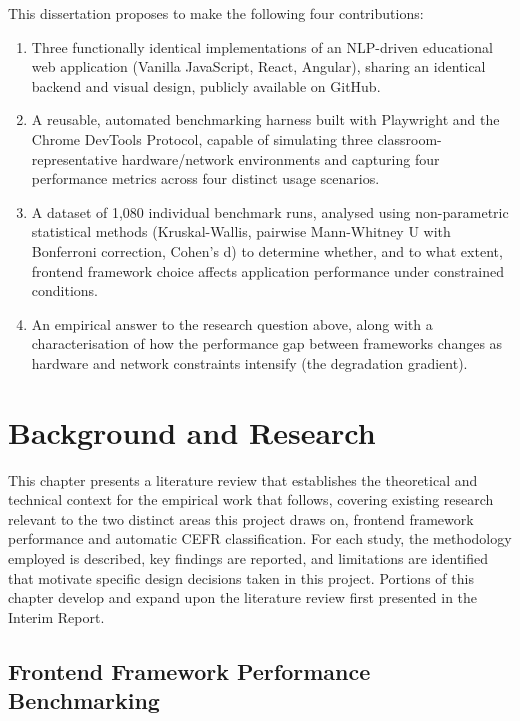 \documentclass[11pt,a4paper]{report}
\begin{document}
This dissertation proposes to make the following four contributions:

\begin{enumerate}
  \item Three functionally identical implementations of an NLP-driven
  educational web application (Vanilla JavaScript, React, Angular),
  sharing an identical backend and visual design, publicly available on
  GitHub.
  \item A reusable, automated benchmarking harness built with Playwright
  and the Chrome DevTools Protocol, capable of simulating three
  classroom-representative hardware/network environments and capturing
  four performance metrics across four distinct usage scenarios.
  \item A dataset of 1,080 individual benchmark runs, analysed using
  non-parametric statistical methods (Kruskal-Wallis, pairwise
  Mann-Whitney U with Bonferroni correction, Cohen's d) to determine
  whether, and to what extent, frontend framework choice affects
  application performance under constrained conditions.
  \item An empirical answer to the research question above, along with a
  characterisation of how the performance gap between frameworks changes
  as hardware and network constraints intensify (the degradation
  gradient).
\end{enumerate}


\chapter{Background and Research}
\label{ch:background}

This chapter presents a literature review that establishes the theoretical and technical context for the empirical work that follows, covering existing research relevant to the two distinct areas this project draws on, frontend framework performance and automatic CEFR classification. For each study, the methodology employed is described, key findings are reported, and limitations are identified that motivate specific design decisions taken in this project. Portions of this chapter develop and expand upon the literature review first presented in the Interim Report.  

\section{Frontend Framework Performance Benchmarking}
\end{document}
